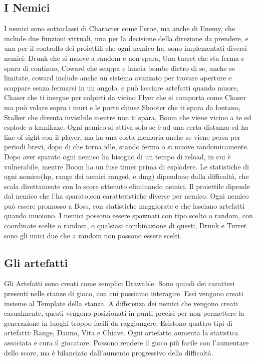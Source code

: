 \documentclass[12pt]{article}
\begin{document}
\subsection*{I Nemici}
I nemici sono sottoclassi di Character come l'eroe, ma anche di Enemy, che include due funzioni virtuali, una per la decisione della direzione da prendere, e una per il controllo dei proiettili che ogni nemico ha.
sono implementati diversi nemici: \hfill\break
Drunk che si muove a random e non spara,\hfill\break
Una turret che sta ferma e spara di continuo, \hfill\break
Coward che scappa e lancia bombe dietro di se, anche se limitate, coward include anche un sistema avanzato per trovare aperture e scappare senza fermarsi in un angolo, e può lasciare artefatti quando muore,\hfill\break
Chaser che ti insegue per colpirti da vicino  \hfill\break
Flyer che si comporta come Chaser ma può volare sopra i muri e le porte chiuse  \hfill\break
Shooter che ti spara da lontano,  \hfill\break
Stalker che diventa invisibile mentre non ti spara,  \hfill\break
Boom che viene vicino a te ed esplode a kamikaze.  \hfill\break
\newline
Ogni nemico si attiva solo se è ad una certa distanza ed ha line of sight con il player, ma ha una corta memoria anche se viene persa per periodi brevi, dopo di che torna idle, stando fermo o si muove randomicamente.
Dopo aver sparato ogni nemico ha bisogno di un tempo di reload, in cui è vulnerabile, mentre Boom ha un fuse timer prima di esplodere.
Le statistiche di ogni nemico(hp, range dei nemici ranged, e dmg) dipendono dalla difficoltà, che scala direttamente con lo score ottenuto eliminando nemici.
Il proiettile dipende dal nemico che l'ha sparato,con caratteristiche diverse per nemico.
Ogni nemico può essere promosso a Boss, con statistiche maggiorate e che lasciano artefatti quando muoiono.
I nemici possono essere spawnati con tipo scelto o random, con coordinate scelte o random, o qualsiasi combinazione di questi, Drunk e Turret sono gli unici due che a random non possono essere scelti.



\subsection*{Gli artefatti}
Gli Artefatti sono creati come semplici Drawable. Sono quindi dei caratteri presenti nelle stanze di gioco, con cui possiamo interagire. Essi vengono creati insieme al Template della stanza. A differenza dei nemici che vengono creati casualmente, questi vengono posizionati in punti precisi per non permettere la generazione in luoghi troppo facili da raggiungere.
Esistono quattro tipi di artefatti: Range, Danno, Vita e Chiave.
Ogni artefatto aumenta la statistica associata e cura il giocatore.
Possono rendere il gioco più facile con l'aumentare dello score, ma è bilanciato dall'aumento progressivo della difficoltà.
\end{document}
